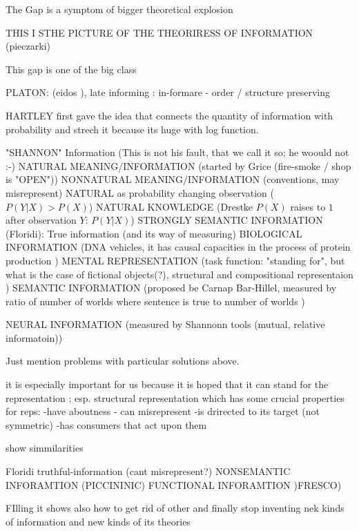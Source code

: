 \documentclass[10pt, aspectratio=169]{beamer}
\begin{document}
\begin{frame} {The Gap is a symptom of bigger theoretical explosion}
    

THIS I STHE PICTURE OF THE THEORIRESS OF INFORMATION 
(pieczarki)

    This gap is  one of the big class 

PLATON: (eidos ), late informing  : in-formare - order / structure  preserving 

 HARTLEY  first gave the idea that connects the quantity of information with probability and strech it because its huge with log function.

    "SHANNON" Information (This is not his fault, that we call it so; he woould not :-)
    NATURAL MEANING/INFORMATION (started by Grice (fire-smoke / shop is "OPEN"))
    NONNATURAL MEANING/INFORMATION  (conventions, may misrepresent)
    NATURAL as probability changing observation ($P(Y|X) > P(X) $)
    NATURAL KNOWLEDGE (Drestke $P(X)$ raises to $1$ after observation $Y$:  $P(Y|X) $) 
    STRONGLY SEMANTIC INFORMATION (Floridi): True information  (and its way of measuring)
BIOLOGICAL INFORMATION (DNA vehicles, it has causal capacities in the process of protein production )
MENTAL REPRESENTATION (task function: "standing for", but what is the case of fictional objects(?), structural and compositional representaion )
SEMANTIC INFORMATION (proposed be  Carnap  Bar-Hillel, measured by  ratio of number of worlds where sentence is true to number of worlds )

    NEURAL INFORMATION (measured by Shannonn tools (mutual, relative informatoin))

Just mention problems with particular solutions above.

    it is especially important for us because it is hoped that it can stand for the representation ; esp. structural representation
    which has some crucial properties for reps:
        -have aboutness 
        - can misrepresent
        -is drirected to its target (not symmetric)
        -has consumers that act upon them

show simmilarities

Floridi truthful-information (cant misrepresent?)
NONSEMANTIC INFORAMTION (PICCININIC)
FUNCTIONAL INFORAMTION  )FRESCO)

    FIlling it shows also how to get rid of other and finally stop inventing nek kinds of information and new kinds of its theories


\end{frame}
\end{document}
